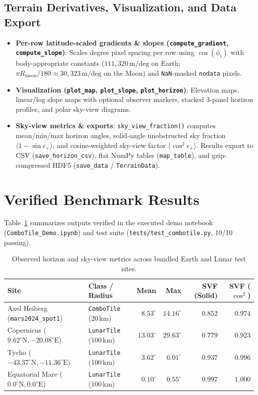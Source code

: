 \documentclass[11pt,letterpaper]{article}
\begin{document}
\subsection{Terrain Derivatives, Visualization, and Data Export}
\begin{itemize}
  \item \textbf{Per-row latitude-scaled gradients \& slopes (\texttt{compute\_gradient}, \texttt{compute\_slope})}: Scales degree pixel spacing per row using $\cos(\phi_i)$ with body-appropriate constants ($111{,}320\,\text{m/deg}$ on Earth; $\pi R_{\text{moon}}/180 \approx 30{,}323\,\text{m/deg}$ on the Moon) and \texttt{NaN}-masked \texttt{nodata} pixels.
  \item \textbf{Visualization (\texttt{plot\_map}, \texttt{plot\_slope}, \texttt{plot\_horizon})}: Elevation maps, linear/log slope maps with optional observer markers, stacked 3-panel horizon profiles, and polar sky-view diagrams.
  \item \textbf{Sky-view metrics \& exports}: \texttt{sky\_view\_fraction()} computes mean/min/max horizon angles, solid-angle unobstructed sky fraction $\langle 1 - \sin\epsilon_+\rangle$, and cosine-weighted sky-view factor $\langle \cos^2\epsilon_+\rangle$. Results export to CSV (\texttt{save\_horizon\_csv}), flat NumPy tables (\texttt{map\_table}), and gzip-compressed HDF5 (\texttt{save\_data} / \texttt{TerrainData}).
\end{itemize}

\section{Verified Benchmark Results}
Table~\ref{tab:sites} summarizes outputs verified in the executed demo notebook (\texttt{ComboTile\_Demo.ipynb}) and test suite (\texttt{tests/test\_combotile.py}, 10/10 passing).

\begin{table}[h!]
\centering
\small
\caption{Observed horizon and sky-view metrics across bundled Earth and Lunar test sites.}
\label{tab:sites}
\begin{tabular}{@{}llrrrr@{}}
\toprule
\textbf{Site} & \textbf{Class / Radius} & \textbf{Mean} & \textbf{Max} & \textbf{SVF (Solid)} & \textbf{SVF ($\cos^2$)} \\
\midrule
Axel Heiberg (\texttt{mars2024\_spot1}) & \texttt{ComboTile} (20\,km) & $8.53^\circ$ & $14.16^\circ$ & $0.852$ & $0.974$ \\
Copernicus ($9.62^\circ\text{N}, -20.08^\circ\text{E}$) & \texttt{LunarTile} (100\,km) & $13.03^\circ$ & $29.63^\circ$ & $0.779$ & $0.923$ \\
Tycho ($-43.37^\circ\text{N}, -11.36^\circ\text{E}$) & \texttt{LunarTile} (100\,km) & $3.62^\circ$ & $6.01^\circ$ & $0.937$ & $0.996$ \\
Equatorial Mare ($0.0^\circ\text{N}, 0.0^\circ\text{E}$) & \texttt{LunarTile} (100\,km) & $0.10^\circ$ & $0.55^\circ$ & $0.997$ & $1.000$ \\
\bottomrule
\end{tabular}
\end{table}
\end{document}
